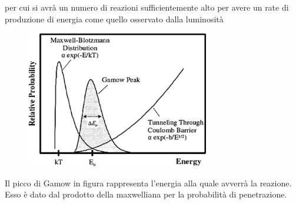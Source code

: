 per cui si avrà un numero di reazioni sufficientemente alto per avere un rate di produzione di energia come quello osservato dalla luminosità

\begin{figure}[H]
    \centering
    \includegraphics[width=8cm]{prob.png}
\end{figure}

Il picco di Gamow in figura rappresenta l'energia alla quale avverrà la reazione. Esso è dato dal prodotto della maxwelliana per la probabilità di penetrazione.

